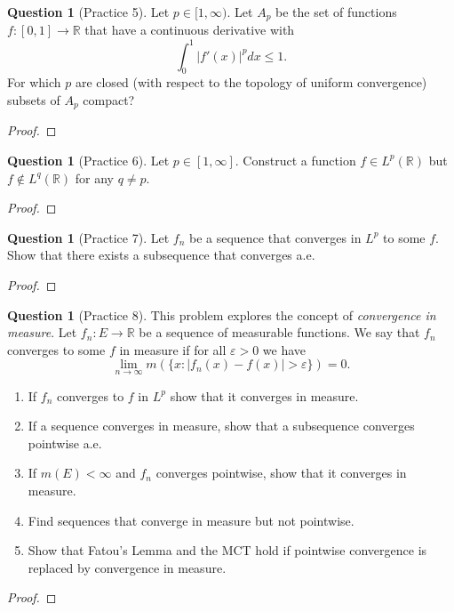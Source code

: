 \documentclass{article}
\theoremstyle{definition} %
\numberwithin{thm}{section} %
\theoremstyle{definition} %
\newtheorem{question}[thm]{Question}
\begin{document}
\begin{question}[Practice 5]
Let $p \in [1, \infty)$. Let $A_p$ be the set of functions $f : [0, 1] \to \mathbb{R}$ that have a continuous derivative with
\[
\int_0^1 |f'(x)|^p dx \leq 1.
\]
For which $p$ are closed (with respect to the topology of uniform convergence) subsets of $A_p$ compact?
\end{question}
\begin{proof}

\end{proof}

\begin{question}[Practice 6]
Let $p \in [1, \infty]$. Construct a function $f \in L^p(\mathbb{R})$ but $f \notin L^q(\mathbb{R})$ for any $q \neq p$.
\end{question}
\begin{proof}

\end{proof}

\begin{question}[Practice 7]
Let $f_n$ be a sequence that converges in $L^p$ to some $f$. Show that there exists a subsequence that converges a.e.
\end{question}
\begin{proof}

\end{proof}

\begin{question}[Practice 8]
This problem explores the concept of \textit{convergence in measure}. Let $f_n : E \to \mathbb{R}$ be a sequence of measurable functions. We say that $f_n$ converges to some $f$ in measure if for all $\varepsilon > 0$ we have
\[
\lim_{n \to \infty} m(\{x : |f_n(x) - f(x)| > \varepsilon\}) = 0.
\]
\begin{enumerate}[label=(\alph*)]
    \item If $f_n$ converges to $f$ in $L^p$ show that it converges in measure.
    \item If a sequence converges in measure, show that a subsequence converges pointwise a.e.
    \item If $m(E) < \infty$ and $f_n$ converges pointwise, show that it converges in measure.
    \item Find sequences that converge in measure but not pointwise.
    \item Show that Fatou’s Lemma and the MCT hold if pointwise convergence is replaced by convergence in measure.
\end{enumerate}
\end{question}
\begin{proof}

\end{proof}
\end{document}
